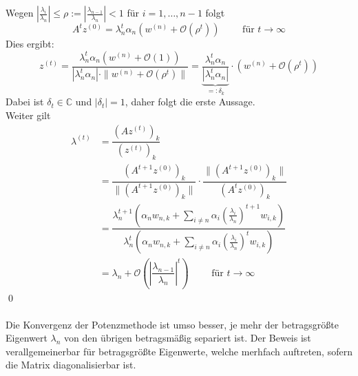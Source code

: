 Wegen $|\tfrac{\lambda_i}{\lambda_n}|\leq \rho:=|\tfrac{\lambda_{n-1}}{\lambda_n}|<1$ für $i=1,\dotsc,n-1$ folgt
\[A^tz^{(0)} = \lambda_n^t\alpha_n(w^{(n)}+\mathcal{O}(\rho^t))
\qquad \text{ für } t\rightarrow \infty\]
Dies ergibt:
\[z^{(t)} = \dfrac{\lambda_n^t\alpha_n(w^{(n)}+
\mathcal{O}(1))}{|\lambda_n^t\alpha_n|\cdot\|w^{(n)}+\mathcal{O}(\rho^t)\|}
= \underbrace{\dfrac{\lambda_n^t\alpha_n}{|\lambda_n^t\alpha_n|}}_{=:\delta_k}\cdot (w^{(n)}+\mathcal{O}(\rho^t))\]
Dabei ist $\delta_t\in\mathbb{C}$ und $|\delta_t|=1$, daher folgt die erste Aussage.\\
Weiter gilt 
\begin{align*}
    \lambda^{(t)} &= \dfrac{(Az^{(t)})_k}{(z^{(t)})_k} \\
    &= \dfrac{(A^{t+1}z^{(0)})_k}{\|(A^{t+1}z^{(0)})_k\|}\cdot\dfrac{{\|(A^{t+1}z^{(0)})_k\|}}{(A^tz^{(0)})_k} \\
    &= \dfrac{\lambda_n^{t+1}(\alpha_n w_{n,k}+\sum_{i\neq n} \alpha_i(\tfrac{\lambda_i}{\lambda_n})^{t+1}w_{i,k})}
    {\lambda_n^t(\alpha_n w_{n,k}+\sum_{i\neq n} \alpha_i(\tfrac{\lambda_i}{\lambda_n})^tw_{i,k})} \\
    &= \lambda_n + \mathcal{O}\left(\left|\dfrac{\lambda_{n-1}}{\lambda_n}\right|^t\right)\qquad 
    \text{ für } t\rightarrow \infty
\end{align*}
\qed \\ \\
Die Konvergenz der Potenzmethode ist umso besser, je mehr der betragsgrößte Eigenwert $\lambda_n$ von den übrigen 
betragsmäßig separiert ist. Der Beweis ist verallgemeinerbar für betragsgrößte Eigenwerte, welche merhfach 
auftreten, sofern die Matrix diagonalisierbar ist. \\ \\
